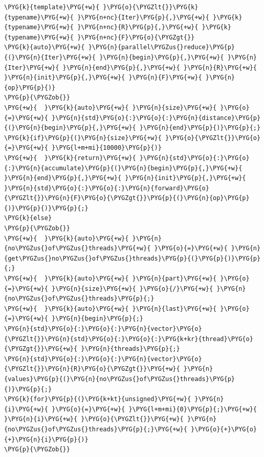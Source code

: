 \begin{codeblockbg}
\begin{Verbatim}[commandchars=\\\{\},breaklines=true,breakanywhere=true,fontsize=\codefont,xleftmargin=17bp]
\PYG{k}{template}\PYG{+w}{ }\PYG{o}{\PYGZlt{}}\PYG{k}{typename}\PYG{+w}{ }\PYG{n+nc}{Iter}\PYG{p}{,}\PYG{+w}{ }\PYG{k}{typename}\PYG{+w}{ }\PYG{n+nc}{R}\PYG{p}{,}\PYG{+w}{ }\PYG{k}{typename}\PYG{+w}{ }\PYG{n+nc}{F}\PYG{o}{\PYGZgt{}}
\PYG{k}{auto}\PYG{+w}{ }\PYG{n}{parallel\PYGZus{}reduce}\PYG{p}{(}\PYG{n}{Iter}\PYG{+w}{ }\PYG{n}{begin}\PYG{p}{,}\PYG{+w}{ }\PYG{n}{Iter}\PYG{+w}{ }\PYG{n}{end}\PYG{p}{,}\PYG{+w}{ }\PYG{n}{R}\PYG{+w}{ }\PYG{n}{init}\PYG{p}{,}\PYG{+w}{ }\PYG{n}{F}\PYG{+w}{ }\PYG{n}{op}\PYG{p}{)}
\PYG{p}{\PYGZob{}}
\PYG{+w}{  }\PYG{k}{auto}\PYG{+w}{ }\PYG{n}{size}\PYG{+w}{ }\PYG{o}{=}\PYG{+w}{ }\PYG{n}{std}\PYG{o}{:}\PYG{o}{:}\PYG{n}{distance}\PYG{p}{(}\PYG{n}{begin}\PYG{p}{,}\PYG{+w}{ }\PYG{n}{end}\PYG{p}{)}\PYG{p}{;}
\PYG{k}{if}\PYG{p}{(}\PYG{n}{size}\PYG{+w}{ }\PYG{o}{\PYGZlt{}}\PYG{o}{=}\PYG{+w}{ }\PYG{l+m+mi}{10000}\PYG{p}{)}
\PYG{+w}{  }\PYG{k}{return}\PYG{+w}{ }\PYG{n}{std}\PYG{o}{:}\PYG{o}{:}\PYG{n}{accumulate}\PYG{p}{(}\PYG{n}{begin}\PYG{p}{,}\PYG{+w}{ }\PYG{n}{end}\PYG{p}{,}\PYG{+w}{ }\PYG{n}{init}\PYG{p}{,}\PYG{+w}{ }\PYG{n}{std}\PYG{o}{:}\PYG{o}{:}\PYG{n}{forward}\PYG{o}{\PYGZlt{}}\PYG{n}{F}\PYG{o}{\PYGZgt{}}\PYG{p}{(}\PYG{n}{op}\PYG{p}{)}\PYG{p}{)}\PYG{p}{;}
\PYG{k}{else}
\PYG{p}{\PYGZob{}}
\PYG{+w}{  }\PYG{k}{auto}\PYG{+w}{ }\PYG{n}{no\PYGZus{}of\PYGZus{}threads}\PYG{+w}{ }\PYG{o}{=}\PYG{+w}{ }\PYG{n}{get\PYGZus{}no\PYGZus{}of\PYGZus{}threads}\PYG{p}{(}\PYG{p}{)}\PYG{p}{;}
\PYG{+w}{  }\PYG{k}{auto}\PYG{+w}{ }\PYG{n}{part}\PYG{+w}{ }\PYG{o}{=}\PYG{+w}{ }\PYG{n}{size}\PYG{+w}{ }\PYG{o}{/}\PYG{+w}{ }\PYG{n}{no\PYGZus{}of\PYGZus{}threads}\PYG{p}{;}
\PYG{+w}{  }\PYG{k}{auto}\PYG{+w}{ }\PYG{n}{last}\PYG{+w}{ }\PYG{o}{=}\PYG{+w}{ }\PYG{n}{begin}\PYG{p}{;}
\PYG{n}{std}\PYG{o}{:}\PYG{o}{:}\PYG{n}{vector}\PYG{o}{\PYGZlt{}}\PYG{n}{std}\PYG{o}{:}\PYG{o}{:}\PYG{k+kr}{thread}\PYG{o}{\PYGZgt{}}\PYG{+w}{ }\PYG{n}{threads}\PYG{p}{;}
\PYG{n}{std}\PYG{o}{:}\PYG{o}{:}\PYG{n}{vector}\PYG{o}{\PYGZlt{}}\PYG{n}{R}\PYG{o}{\PYGZgt{}}\PYG{+w}{ }\PYG{n}{values}\PYG{p}{(}\PYG{n}{no\PYGZus{}of\PYGZus{}threads}\PYG{p}{)}\PYG{p}{;}
\PYG{k}{for}\PYG{p}{(}\PYG{k+kt}{unsigned}\PYG{+w}{ }\PYG{n}{i}\PYG{+w}{ }\PYG{o}{=}\PYG{+w}{ }\PYG{l+m+mi}{0}\PYG{p}{;}\PYG{+w}{ }\PYG{n}{i}\PYG{+w}{ }\PYG{o}{\PYGZlt{}}\PYG{+w}{ }\PYG{n}{no\PYGZus{}of\PYGZus{}threads}\PYG{p}{;}\PYG{+w}{ }\PYG{o}{+}\PYG{o}{+}\PYG{n}{i}\PYG{p}{)}
\PYG{p}{\PYGZob{}}

\end{Verbatim}
\end{codeblockbg}
